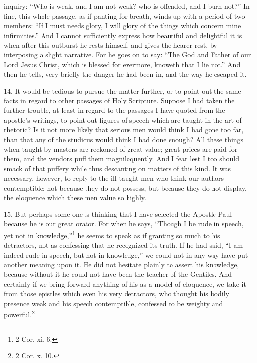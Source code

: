 inquiry: “Who is weak, and I am not weak? who is offended, and I burn not?” In fine, this whole passage, as if panting for breath, winds up with a period of two members: “If I must needs glory, I will glory of the things which concern mine infirmities.” And I cannot sufficiently express how beautiful and delightful it is when after this outburst he rests himself, and gives the hearer rest, by interposing a slight narrative. For he goes on to say: “The God and Father of our Lord Jesus Christ, which is blessed for evermore, knoweth that I lie not.” And then he tells, very briefly the danger he had been in, and the way he escaped it.

14. It would be tedious to pursue the matter further, or to point out the same facts in regard to other passages of Holy Scripture. Suppose I had taken the further trouble, at least in regard to the passages I have quoted from the apostle’s writings, to point out figures of speech which are taught in the art of rhetoric? Is it not more likely that serious men would think I had gone too far, than that any of the studious would think I had done enough? All these things when taught by masters are reckoned of great value; great prices are paid for them, and the vendors puff them magniloquently. And I fear lest I too should smack of that puffery while thus descanting on matters of this kind. It was necessary, however, to reply to the ill-taught men who think our authors contemptible; not because they do not possess, but because they do not display, the eloquence which these men value so highly.

15. But perhaps some one is thinking that I have selected the Apostle Paul because he is our great orator. For when he says, “Though I be rude in speech, yet not in knowledge,”\footnote{2 Cor. xi. 6.} he seems to speak as if granting so much to his detractors, not as confessing that he recognized its truth. If he had said, “I am indeed rude in speech, but not in knowledge,” we could not in any way have put another meaning upon it. He did not hesitate plainly to assert his knowledge, because without it he could not have been the teacher of the Gentiles. And certainly if we bring forward anything of his as a model of eloquence, we take it from those epistles which even his very detractors, who thought his bodily presence weak and his speech contemptible, confessed to be weighty and powerful.\footnote{2 Cor. x. 10.}

